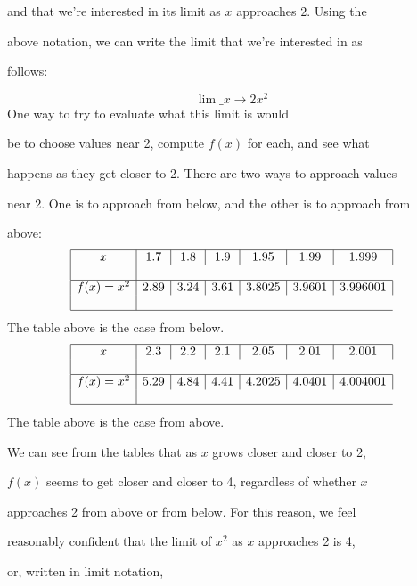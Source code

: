 and that we're interested in its limit as $x$ approaches $2$. Using the

above notation, we can write the limit that we're interested in as

follows:



$$\lim\_{x\to2}x^2$$ One way to try to evaluate what this limit is would

be to choose values near 2, compute $f(x)$ for each, and see what

happens as they get closer to 2. There are two ways to approach values

near 2. One is to approach from below, and the other is to approach from

above:
$$
\begin{array}{|c|c|c|c|c|c|c|}

\hline

x & 1.7 & 1.8 & 1.9 & 1.95 & 1.99 & 1.999 \\\\ \hline

f(x)=x^2 & 2.89 & 3.24 & 3.61 & 3.8025 & 3.9601 & 3.996001 \\\\ \hline

\end{array}
$$                                                  
The table above is the case from below.
$$
\begin{array}{|c|c|c|c|c|c|c|}

\hline

x & 2.3 & 2.2 & 2.1 & 2.05 & 2.01 & 2.001 \\\\ \hline

f(x)=x^2 & 5.29 & 4.84 & 4.41 & 4.2025 & 4.0401 & 4.004001 \\\\ \hline

\end{array}
$$ 
The table above is the case from above.



We can see from the tables that as $x$ grows closer and closer to 2,

$f(x)$ seems to get closer and closer to 4, regardless of whether $x$

approaches 2 from above or from below. For this reason, we feel

reasonably confident that the limit of $x^2$ as $x$ approaches 2 is 4,

or, written in limit notation,



